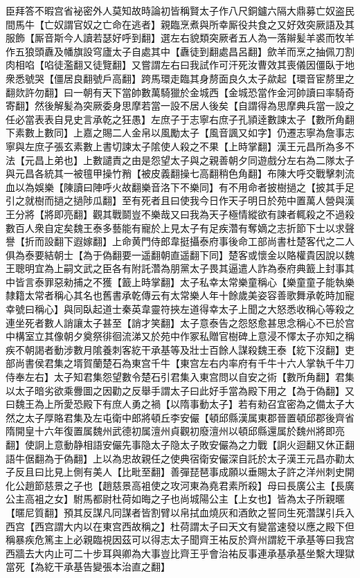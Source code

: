 臣拜答不暇宫省袐密外人莫知故時論初皆稱賢太子作八尺銅鑪六隔大鼎募亡奴盗民間馬牛【亡奴謂官奴之亡命在逃者】親臨烹煮與所幸厮役共食之又好效突厥語及其服飾【厮音斯今人讀若瑟好呼到翻】選左右貌類突厥者五人為一落辮髪羊裘而牧羊作五狼頭纛及幡旗設穹廬太子自處其中【纛徒到翻處昌呂翻】歛羊而烹之抽佩刀割肉相啗【啗徒濫翻又徒覽翻】又嘗謂左右曰我試作可汗死汝曹效其喪儀因僵臥于地衆悉號哭【僵居良翻號戶高翻】跨馬環走臨其身剺面良久太子歘起【環音宦剺里之翻欻許勿翻】曰一朝有天下當帥數萬騎獵於金城西【金城恐當作金河帥讀曰率騎奇寄翻】然後解髪為突厥委身思摩若當一設不居人後矣【自謂得為思摩典兵當一設之任必當表表自見史言承乾之狂愚】左庶子于志寧右庶子孔頴逹數諫太子【數所角翻下素數上數同】上嘉之賜二人金帛以風勵太子【風音諷又如字】仍遷志寧為詹事志寧與左庶子張玄素數上書切諫太子隂使人殺之不果【上時掌翻】漢王元昌所為多不法【元昌上弟也】上數譴責之由是怨望太子與之親善朝夕同遊戲分左右為二隊太子與元昌各統其一被氊甲操竹矟【被皮義翻操七高翻稍色角翻】布陳大呼交戰擊刺流血以為娛樂【陳讀曰陣呼火故翻樂音洛下不樂同】有不用命者披樹撾之【披其手足引之就樹而撾之撾陟瓜翻】至有死者且曰使我今日作天子明日於苑中置萬人營與漢王分將【將即亮翻】觀其戰鬬豈不樂哉又曰我為天子極情縱欲有諫者輒殺之不過殺數百人衆自定矣魏王泰多藝能有寵於上見太子有足疾濳有奪嫡之志折節下士以求聲譽【折而設翻下遐嫁翻】上命黄門侍郎韋挺攝泰府事後命工部尚書杜楚客代之二人俱為泰要結朝士【為于偽翻要一遥翻朝直遥翻下同】楚客或懷金以賂權貴因說以魏王聰明宜為上嗣文武之臣各有附託濳為朋黨太子畏其逼遣人詐為泰府典籖上封事其中皆言泰罪惡勑捕之不獲【籖上時掌翻】太子私幸太常樂童稱心【樂童童子能執樂隸籍太常者稱心其名也舊書承乾傳云有太常樂人年十餘歲美姿容善歌舞承乾時加寵幸號曰稱心】與同臥起道士秦英韋靈符挾左道得幸太子上聞之大怒悉收稱心等殺之連坐死者數人誚讓太子甚至【誚才笑翻】太子意泰告之怨怒愈甚思念稱心不已於宫中構室立其像朝夕奠祭徘徊流涕又於苑中作冢私贈官樹碑上意浸不懌太子亦知之稱疾不朝謁者動涉數月隂養刺客紇干承基等及壯士百餘人謀殺魏王泰【紇下沒翻】吏部尚書侯君集之壻賀蘭楚石為東宫千牛【東宫左右内率府有千牛十六人掌執千牛刀侍奉左右】太子知君集怨望數令楚石引君集入東宫問以自安之術【數所角翻】君集以太子暗劣欲乘釁圖之因勸之反舉手謂太子曰此好手當為殿下用之【為于偽翻】又曰魏王為上所愛恐殿下有庶人勇之禍【以隋事動太子】若有勑召宜密為之備太子大然之太子厚賂君集及左屯衛中郎將頓丘李安儼【頓邱縣漢属東郡晉置頓邱郡後齊省隋開皇十六年復置属魏州武德初属澶州貞觀初廢澶州以頓邱縣還属於魏州將即亮翻】使詗上意動静相語安儼先事隐太子隐太子敗安儼為之力戰【詗火迴翻又休正翻語牛倨翻為于偽翻】上以為忠故親任之使典宿衛安儼深自託於太子漢王元昌亦勸太子反且曰比見上側有美人【比毗至翻】善彈琵琶事成願以垂賜太子許之洋州刺史開化公趙節慈景之子也【趙慈景高袓使之攻河東為堯君素所殺】母曰長廣公主【長廣公主高袓之女】駙馬都尉杜荷如晦之子也尚城陽公主【上女也】皆為太子所親暱【暱尼質翻】預其反謀凡同謀者皆割臂以帛拭血燒灰和酒飲之誓同生死濳謀引兵入西宫【西宫謂大内以在東宫西故稱之】杜荷謂太子曰天文有變當速發以應之殿下但稱暴疾危篤主上必親臨視因茲可以得志太子聞齊王祐反於齊州謂紇干承基等曰我宫西牆去大内止可二十步耳與卿為大事豈比齊王乎會治祐反事連承基承基坐繫大理獄當死【為紇干承基告變張本治直之翻】

